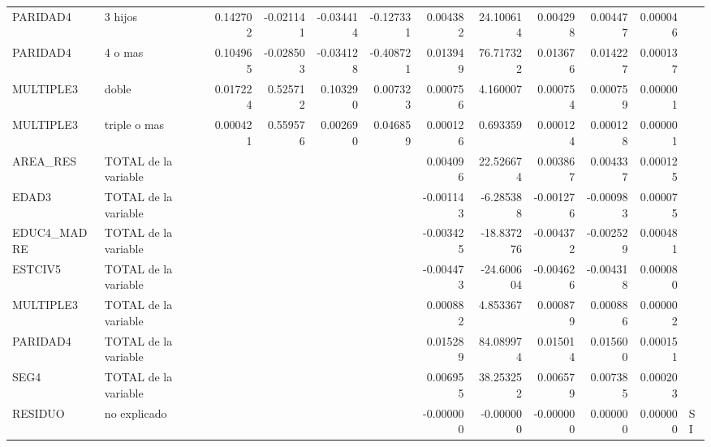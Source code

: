 \begin{tabular}{llrrrrrrrrrl}
PARIDAD4 & 3 hijos & 0.142702 & -0.021141 & -0.034414 & -0.127331 & 0.004382 & 24.100614 & 0.004298 & 0.004477 & 0.000046 &  \\
PARIDAD4 & 4 o mas & 0.104965 & -0.028503 & -0.034128 & -0.408721 & 0.013949 & 76.717322 & 0.013676 & 0.014227 & 0.000137 &  \\
MULTIPLE3 & doble & 0.017224 & 0.525712 & 0.103290 & 0.007323 & 0.000756 & 4.160007 & 0.000754 & 0.000759 & 0.000001 &  \\
MULTIPLE3 & triple o mas & 0.000421 & 0.559576 & 0.002690 & 0.046859 & 0.000126 & 0.693359 & 0.000124 & 0.000128 & 0.000001 &  \\
AREA\_RES & TOTAL de la variable &  &  &  &  & 0.004096 & 22.526674 & 0.003867 & 0.004337 & 0.000125 &  \\
EDAD3 & TOTAL de la variable &  &  &  &  & -0.001143 & -6.285388 & -0.001276 & -0.000983 & 0.000075 &  \\
EDUC4\_MADRE & TOTAL de la variable &  &  &  &  & -0.003425 & -18.837276 & -0.004372 & -0.002529 & 0.000481 &  \\
ESTCIV5 & TOTAL de la variable &  &  &  &  & -0.004473 & -24.600604 & -0.004626 & -0.004318 & 0.000080 &  \\
MULTIPLE3 & TOTAL de la variable &  &  &  &  & 0.000882 & 4.853367 & 0.000879 & 0.000886 & 0.000002 &  \\
PARIDAD4 & TOTAL de la variable &  &  &  &  & 0.015289 & 84.089974 & 0.015014 & 0.015600 & 0.000151 &  \\
SEG4 & TOTAL de la variable &  &  &  &  & 0.006955 & 38.253252 & 0.006579 & 0.007385 & 0.000203 &  \\
RESIDUO & no explicado &  &  &  &  & -0.000000 & -0.000000 & -0.000000 & 0.000000 & 0.000000 & SI \\
\bottomrule
\end{tabular}
